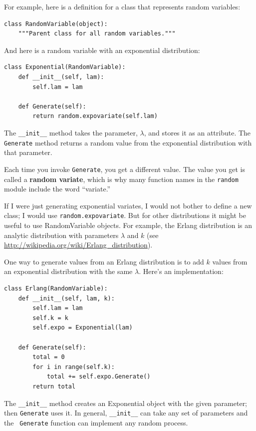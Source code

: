 \documentclass[12pt]{book}
\begin{document}
For example, here is a definition for a class that represents
random variables:
%
\begin{verbatim}
class RandomVariable(object):
    """Parent class for all random variables."""
\end{verbatim}

And here is a random variable with an exponential distribution:
%
\begin{verbatim}
class Exponential(RandomVariable):
    def __init__(self, lam):
        self.lam = lam

    def Generate(self):
        return random.expovariate(self.lam)
\end{verbatim}

The \verb"__init__" method takes the parameter, $\lambda$, and stores it as
an attribute.  The {\tt Generate} method returns a random value
from the exponential distribution with that parameter.

Each time you invoke {\tt Generate}, you get a different value.  The
value you get is called a {\bf random variate}, which is why many
function names in the {\tt random} module include the word ``variate.''

If I were just generating exponential variates, I would not bother to
define a new class; I would use {\tt random.expovariate}.  But for
other distributions it might be useful to use RandomVariable objects.
For example, the Erlang distribution is an analytic distribution with
parameters $\lambda$ and $k$ (see
\url{http://wikipedia.org/wiki/Erlang_distribution}).

One way to generate values from an Erlang distribution is to add
$k$ values from an exponential distribution with the same $\lambda$.
Here's an implementation:
%
\begin{verbatim}
class Erlang(RandomVariable):
    def __init__(self, lam, k):
        self.lam = lam
        self.k = k
        self.expo = Exponential(lam)

    def Generate(self):
        total = 0
        for i in range(self.k):
            total += self.expo.Generate()
        return total
\end{verbatim}

The \verb"__init__" method creates an Exponential object with the
given parameter; then {\tt Generate} uses it.  In general,
\verb"__init__" can take any set of parameters and the {\tt
  Generate} function can implement any random process.
\end{document}
